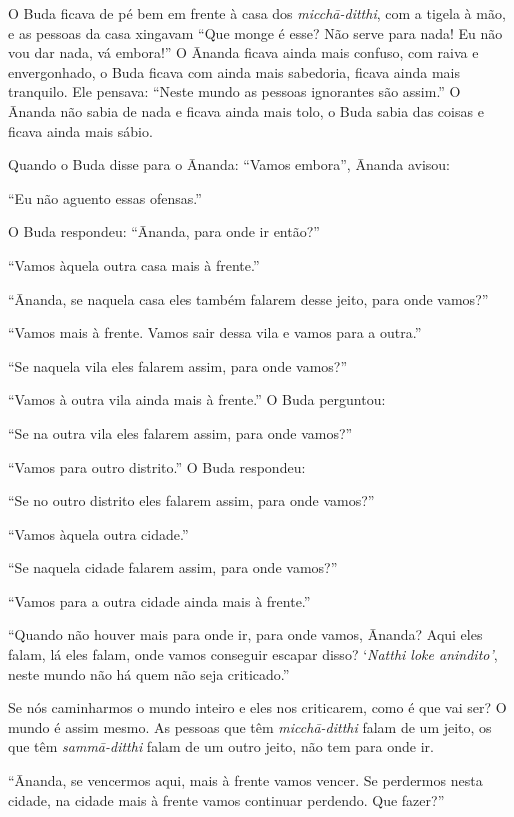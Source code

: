 O Buda ficava de pé bem em frente à casa dos
\textit{micch\=a-ditthi}, com a tigela à mão, e as pessoas da casa
xingavam “Que monge é esse? Não serve para nada! Eu não vou dar nada,
vá embora!” O \=Ananda ficava ainda mais confuso, com raiva e
envergonhado, o Buda ficava com ainda mais sabedoria, ficava ainda mais
tranquilo. Ele pensava: “Neste mundo as pessoas ignorantes são assim.”
O \=Ananda não sabia de nada e ficava ainda mais tolo, o Buda sabia das
coisas e ficava ainda mais sábio. 

Quando o Buda disse para o \=Ananda: “Vamos embora”, \=Ananda
avisou: 

“Eu não aguento essas ofensas.” 

O Buda respondeu: “\=Ananda, para onde ir então?”

“Vamos àquela outra casa mais à frente.”

“\=Ananda, se naquela casa eles também falarem desse jeito, para
onde vamos?”

“Vamos mais à frente. Vamos sair dessa vila e vamos para a outra.”

“Se naquela vila eles falarem assim, para onde vamos?”

“Vamos à outra vila ainda mais à frente.” O Buda perguntou:

“Se na outra vila eles falarem assim, para onde vamos?”

“Vamos para outro distrito.” O Buda respondeu: 

“Se no outro distrito eles falarem assim, para onde vamos?”

“Vamos àquela outra cidade.”

“Se naquela cidade falarem assim, para onde vamos?”

“Vamos para a outra cidade ainda mais à frente.”

“Quando não houver mais para onde ir, para onde vamos, \=Ananda?
Aqui eles falam, lá eles falam, onde vamos conseguir escapar disso?
‘\textit{Natthi loke anindito}\textit{’}, neste mundo não há quem não
seja criticado.” 

Se nós caminharmos o mundo inteiro e eles nos criticarem, como é que
vai ser? O mundo é assim mesmo. As pessoas que têm
\textit{micch\=a-ditthi }falam de um jeito, os que têm
\textit{samm\=a-ditthi }falam de um outro jeito, não tem para onde ir. 

“\=Ananda, se vencermos aqui, mais à frente vamos vencer. Se
perdermos nesta cidade, na cidade mais à frente vamos continuar
perdendo. Que fazer?”

